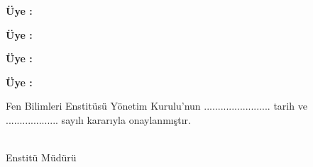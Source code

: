 \documentclass[]{esogu}			%
\begin{document}
\noindent \textbf{Üye :\space}\jiki

\noindent \textbf{Üye :\space}\juc

\noindent \textbf{Üye :\space}\jdort

\noindent \textbf{Üye :\space}\jbes

\vspace{15mm}

\begin{framed}
Fen Bilimleri Enstitüsü Yönetim Kurulu'nun ........................ tarih ve  \space \space \space \space \space\\................... sayılı kararıyla onaylanmıştır. 
\newline
\newline
\begin{flushright}
\mudur \\
Enstitü Müdürü\space \space \space \space \space \space \space \space \space \space \space \space \space \space %
\end{flushright}

\end{framed}


\renewcommand{\listfigurename}{ŞEKİLLER DİZİNİ}
\renewcommand{\listtablename}{ÇİZELGELER DİZİNİ}

\setlength\beforechapskip{-\baselineskip}


\normalsize

\clearpage





\addto\captionturkish{%
  \renewcommand{\contentsname}%
    {İÇİNDEKİLER}%
}

\tableofcontents
\newpage
\listoffigures
\newpage
\listoftables

\clearpage
\printglossary[style=mylong3col, type=\acronymtype, title=Simgeler ve Kısaltmalar Dizini, toctitle=SİMGELER VE KISALTMALAR DİZİNİ]
\clearpage
\renewcommand{\listtheoremname}{TEOREMLER DİZİNİ}
\listoftheorems[ignoreall,onlynamed={theorem}]
\clearpage
\renewcommand{\listtheoremname}{İSPATLAR DİZİNİ}
\listoftheorems[ignoreall, show={ispat}]
\clearpage

\mainmatter %
\setcounter{secnumdepth}{5} %
\end{document}
